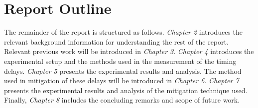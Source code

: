 \section{Report Outline}
The remainder of the report is structured as follows. \textit{Chapter 2} introduces the relevant background information for understanding the rest of the report.
Relevant previous work will be introduced in \textit{Chapter 3}.
\textit{Chapter 4} introduces the experimental setup and the methods used in the measurement of the timing delays. \textit{Chapter 5} presents the experimental results and analysis.
The method used in mitigation of these delays will be introduced in \textit{Chapter 6}.
\textit{Chapter 7} presents the experimental results and analysis of the mitigation technique used.
Finally, \textit{Chapter 8} includes the concluding remarks and scope of future work.
